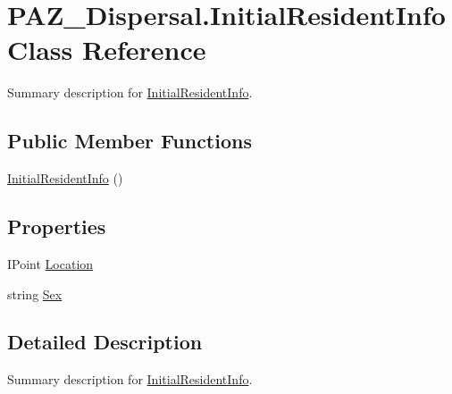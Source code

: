 \hypertarget{class_p_a_z___dispersal_1_1_initial_resident_info}{\section{P\-A\-Z\-\_\-\-Dispersal.\-Initial\-Resident\-Info Class Reference}
\label{class_p_a_z___dispersal_1_1_initial_resident_info}
}


Summary description for \hyperlink{class_p_a_z___dispersal_1_1_initial_resident_info}{Initial\-Resident\-Info}.  


\subsection*{Public Member Functions}
\begin{DoxyCompactItemize}
\item 
\hyperlink{class_p_a_z___dispersal_1_1_initial_resident_info_a2a0d15fe2ca1de17ccd71ba1da05b788}{Initial\-Resident\-Info} ()
\end{DoxyCompactItemize}
\subsection*{Properties}
\begin{DoxyCompactItemize}
\item 
I\-Point \hyperlink{class_p_a_z___dispersal_1_1_initial_resident_info_a6962a40c38209f5a22fbf57c124a2372}{Location}
\item 
string \hyperlink{class_p_a_z___dispersal_1_1_initial_resident_info_af697648764a6ae2bd625a188cccfc053}{Sex}
\end{DoxyCompactItemize}


\subsection{Detailed Description}
Summary description for \hyperlink{class_p_a_z___dispersal_1_1_initial_resident_info}{Initial\-Resident\-Info}. 



